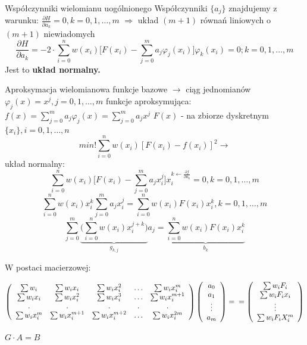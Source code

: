 \begin{frame}{Współczynniki wielomianu uogólnionego}
    Współczynniki $\{a_j\}$ znajdujemy z warunku: $\frac{\partial H}{\partial a_k} = 0, k=0,1,\ldots,m$
    $\Rightarrow$ układ $(m+1)$ równań liniowych o $(m+1)$ niewiadomych
    $$\frac{\partial H}{\partial a_k} = -2 \cdot \sum_{i=0}^{n}w(x_i)\bigg[F(x_i)-\sum_{j=0}^{m}a_j\varphi_j(x_i)\bigg]\varphi_k(x_i)=0;k=0,1,\ldots,m$$
    Jest to \textbf{układ normalny.}
\end{frame}
\begin{frame}{Aproksymacja wielomianowa}
	funkcje bazowe $\rightarrow$ ciąg jednomianów $\varphi_j(x) = x^j,j=0,1,\ldots,m$\newline
    funkcje aproksymująca: $f(x) = \sum_{j=0}^{m}a_j\varphi_j(x)=\sum_{j=0}^{m}a_jx^j$ \newline
    $F(x)$ - na zbiorze dyskretnym $\{x_i\},i=0,1,\ldots,n$
    $$min!\sum_{i=0}^{n}w(x_i)[F(x_i)-f(x_i)]^2 \rightarrow$$
    układ normalny:
    $$\sum_{i=0}^{n}w(x_i)\bigg[F(x_i)-\sum_{j=0}^{m}a_jx_i^j\bigg]x_i^{k\leftarrow\frac{\partial f}{\partial a_k}}=0,k=0,1,\ldots,m$$
    $$\sum_{i=0}^{n}w(x_i)x_i^k\sum_{j=0}^{m}a_jx_i^j=\sum_{i=0}^{n}w(x_i)F(x_i)x_i^k,k=0,1,\ldots,m$$
    $$\sum_{j=0}^{m}\underbrace{\bigg(\sum_{i=0}^{n}w(x_i)x_i^{j+k}\bigg)}_{g_{k,j}}a_j = \underbrace{\sum_{i=0}^{n}w(x_i)F(x_i)x_i^k}_{b_k}$$
\end{frame}
\begin{frame}
	W postaci macierzowej:
    \begin{center}
    	 $\left(\begin{array}{ccccc}
    \sum w_i & \sum w_ix_i & \sum w_ix_i^2 & \ldots & \sum w_i x_i^m \\
    \sum w_ix_i & \sum w_ix_i^2 & \sum w_ix_i^3 & \ldots & \sum w_i x_i^{m+1} \\
    . & . & . & . & . \\
    \sum w_ix_i^m & \sum w_ix_i^{m+1} & \sum w_ix_i^{m+2} & \ldots & \sum w_i x_i^{2m}
    \end{array}\right)
    \left(\begin{array}{c}
    	a_0 \\ a_1 \\ \vdots \\ a_m
    \end{array}\right) =\newline=
    \left(\begin{array}{c}
    	\sum w_iF_i\\
        \sum w_i F_i x_i \\
        \vdots \\
        \sum w_i F_i X_i^m
    \end{array}\right)$
    \end{center}
    \begin{center}
    	\underline{$G \cdot A = B$}
    \end{center}
   	
\end{frame}
